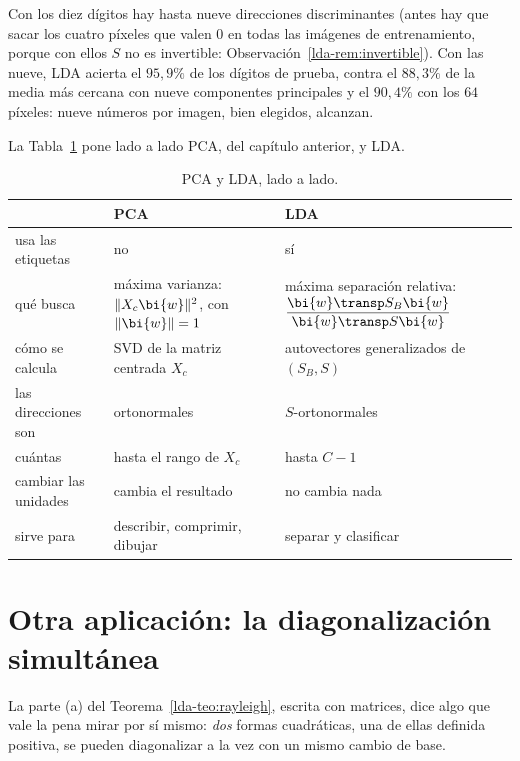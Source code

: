 \begin{example}[Dígitos]\label{lda-ejem:digitos}
Con los diez dígitos hay hasta nueve direcciones discriminantes (antes hay que
sacar los cuatro píxeles que valen $0$ en todas las imágenes de entrenamiento,
porque con ellos $S$ no es invertible: Observación~\ref{lda-rem:invertible}).
Con las nueve, LDA acierta el $95{,}9\%$ de los dígitos de prueba, contra el
$88{,}3\%$ de la media más cercana con nueve componentes principales y el
$90{,}4\%$ con los $64$ píxeles: nueve números por imagen, bien elegidos,
alcanzan.
\end{example}

La Tabla~\ref{lda-tab:pca-lda} pone lado a lado PCA, del capítulo anterior, y LDA.

\begin{table}[!ht]
\centering
\small\renewcommand{\arraystretch}{1.3}
\begin{tabular}{@{}p{3.1cm}p{5.4cm}p{5.4cm}@{}}
\toprule
 & PCA & LDA\tabularnewline
\midrule
\raggedright usa las etiquetas & \raggedright no & \raggedright sí\tabularnewline
\raggedright qué busca & \raggedright máxima varianza: $\|X_c\bi{w}\|^2$, con $\|\bi{w}\|=1$ & \raggedright máxima separación relativa: $\dfrac{\bi{w}\transp S_B\bi{w}}{\bi{w}\transp S\bi{w}}$\tabularnewline
\raggedright cómo se calcula & \raggedright SVD de la matriz centrada $X_c$ & \raggedright autovectores generalizados de $(S_B,S)$\tabularnewline
\raggedright las direcciones son & \raggedright ortonormales & \raggedright $S$-ortonormales\tabularnewline
\raggedright cuántas & \raggedright hasta el rango de $X_c$ & \raggedright hasta $C-1$\tabularnewline
\raggedright cambiar las unidades & \raggedright cambia el resultado & \raggedright no cambia nada\tabularnewline
\raggedright sirve para & \raggedright describir, comprimir, dibujar & \raggedright separar y clasificar\tabularnewline
\bottomrule
\end{tabular}
\caption{PCA y LDA, lado a lado.}
\label{lda-tab:pca-lda}
\end{table}

\section{Otra aplicación: la diagonalización simultánea}\label{lda-sec:simultanea}

La parte (a) del Teorema~\ref{lda-teo:rayleigh}, escrita con matrices, dice algo que
vale la pena mirar por sí mismo: \emph{dos} formas cuadráticas, una de ellas
definida positiva, se pueden diagonalizar a la vez con un mismo cambio de base.

